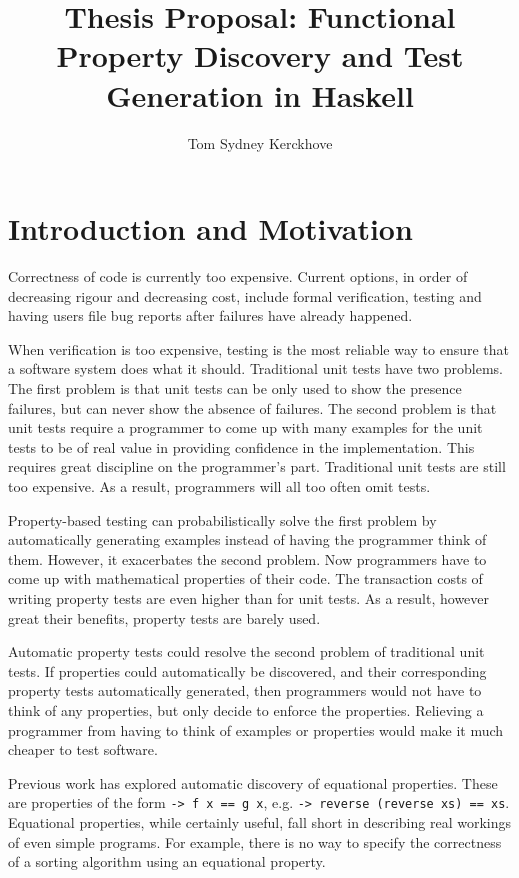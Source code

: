 \documentclass[a4paper, 11pt]{article}
\title{Thesis Proposal: Functional Property Discovery and Test Generation in Haskell}
\author{Tom Sydney Kerckhove}
\begin{document}
\maketitle

\section{Introduction and Motivation}

Correctness of code is currently too expensive.
Current options, in order of decreasing rigour and decreasing cost, include formal verification, testing and having users file bug reports after failures have already happened.

When verification is too expensive, testing is the most reliable way to ensure that a software system does what it should.
Traditional unit tests have two problems.
The first problem is that unit tests can be only used to show the presence failures, but can never show the absence of failures.
The second problem is that unit tests require a programmer to come up with many examples for the unit tests to be of real value in providing confidence in the implementation.
This requires great discipline on the programmer's part.
Traditional unit tests are still too expensive.
As a result, programmers will all too often omit tests.

Property-based testing \cite{QuickCheck} can probabilistically solve the first problem by automatically generating examples instead of having the programmer think of them.
However, it exacerbates the second problem.
Now programmers have to come up with mathematical properties of their code.
The transaction costs of writing property tests are even higher than for unit tests.
As a result, however great their benefits, property tests are barely used.

Automatic property tests could resolve the second problem of traditional unit tests.
If properties could automatically be discovered, and their corresponding property tests automatically generated, then programmers would not have to think of any properties, but only decide to enforce the properties.
Relieving a programmer from having to think of examples or properties would make it much cheaper to test software.

Previous work \cite{QuickSpec} has explored automatic discovery of equational properties.
These are properties of the form \texttt{\x -> f x == g x}, e.g. \texttt{\xs -> reverse (reverse xs) == xs}.
Equational properties, while certainly useful, fall short in describing real workings of even simple programs.
For example, there is no way to specify the correctness of a sorting algorithm using an equational property.
\end{document}
